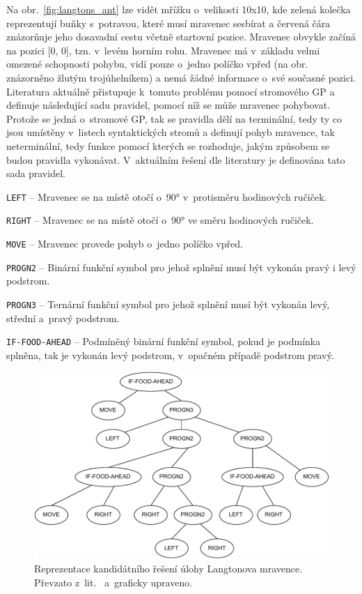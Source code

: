 Na obr.~\ref{fig:langtons_ant} lze vidět mřížku o~velikosti 10x10, kde zelená kolečka reprezentují buňky s~potravou, které musí mravenec sesbírat a červená čára znázorňuje jeho dosavadní cestu včetně startovní pozice. Mravenec obvykle začíná na pozici [0, 0], tzn. v~levém horním rohu. Mravenec má v~základu velmi omezené schopnosti pohybu, vidí pouze o~jedno políčko vpřed (na obr. znázorněno žlutým trojúhelníkem) a nemá žádné informace o~své současné pozici.
Literatura aktuálně přistupuje k~tomuto problému pomocí stromového GP a definuje následující sadu pravidel, pomocí níž se může mravenec pohybovat. Protože se jedná o~stromové GP, tak se pravidla dělí na terminální, tedy ty co jsou umístěny v~listech syntaktických stromů a definují pohyb mravence, tak neterminální, tedy funkce pomocí kterých se rozhoduje, jakým způsobem se budou pravidla vykonávat. 
V~aktuálním řešení dle literatury je definována tato sada pravidel.
\begin{description}
    \item \texttt{LEFT} -- Mravenec se na místě otočí o~90° v~protisměru hodinových ručiček.
    \item \texttt{RIGHT} -- Mravenec se na místě otočí o~90° ve směru hodinových ručiček.
    \item \texttt{MOVE} -- Mravenec provede pohyb o~jedno políčko vpřed.
    \item \texttt{PROGN2} -- Binární funkční symbol pro jehož splnění musí být vykonán pravý i levý podstrom.
    \item \texttt{PROGN3} -- Ternární funkční symbol pro jehož splnění musí být vykonán levý, střední a~pravý podstrom.
    \item \texttt{IF-FOOD-AHEAD} -- Podmíněný binární funkční symbol, pokud je podmínka splněna, tak je vykonán levý podstrom, v~opačném případě podstrom pravý.
\end{description}

\vspace{0.2cm}
\begin{figure}[!h]
    \centering
    \includegraphics[scale=0.7]{obrazky-figures/lit-santafe-example-tree.pdf}
    \caption{Reprezentace kandidátního řešení úlohy Langtonova mravence. Převzato z~lit.~\cite[str. 154]{Brameier1998} a~graficky upraveno.}
    \label{fig:langtons_ant_tree_rep}
\end{figure}
\vspace{0.2cm}

